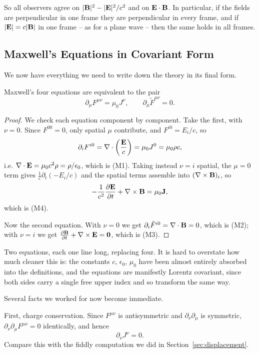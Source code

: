 \documentclass[a4paper]{scrartcl}
\begin{document}
So all observers agree on $|\mathbf{B}|^2 - |\mathbf{E}|^2/c^2$ and on $\mathbf{E}\cdot\mathbf{B}$. In particular, if the fields are perpendicular in one frame they are perpendicular in every frame, and if $|\mathbf{E}| = c|\mathbf{B}|$ in one frame -- as for a plane wave -- then the same holds in all frames.

\subsection{Maxwell's Equations in Covariant Form}

We now have everything we need to write down the theory in its final form.

\begin{theorem}
	Maxwell's four equations are equivalent to the pair
	$$
	\partial_\mu F^{\mu\nu} = \mu_0 J^\nu, \qquad \partial_\mu \tilde F^{\mu\nu} = 0.
	$$
\end{theorem}
\begin{proof}
	We check each equation component by component. Take the first, with $\nu = 0$. Since $F^{00} = 0$, only spatial $\mu$ contribute, and $F^{i0} = E_i/c$, so
	$$
	\partial_i F^{i0} = \nabla\cdot\left(\frac{\mathbf{E}}{c}\right) = \mu_0 J^0 = \mu_0 \rho c,
	$$
	i.e. $\nabla\cdot\mathbf{E} = \mu_0 c^2 \rho = \rho/\epsilon_0$, which is (M1). Taking instead $\nu = i$ spatial, the $\mu = 0$ term gives $\frac{1}{c}\partial_t(-E_i/c)$ and the spatial terms assemble into $(\nabla\times\mathbf{B})_i$, so
	$$
	-\frac{1}{c^2}\frac{\partial \mathbf{E}}{\partial t} + \nabla\times\mathbf{B} = \mu_0\mathbf{J},
	$$
	which is (M4).

	Now the second equation. With $\nu = 0$ we get $\partial_i \tilde F^{i0} = \nabla\cdot\mathbf{B} = 0$, which is (M2); with $\nu = i$ we get $\frac{\partial \mathbf{B}}{\partial t} + \nabla\times\mathbf{E} = \mathbf{0}$, which is (M3).
\end{proof}

Two equations, each one line long, replacing four. It is hard to overstate how much cleaner this is: the constants $c$, $\epsilon_0$, $\mu_0$ have been almost entirely absorbed into the definitions, and the equations are manifestly Lorentz covariant, since both sides carry a single free upper index and so transform the same way.

Several facts we worked for now become immediate.

First, charge conservation. Since $F^{\mu\nu}$ is antisymmetric and $\partial_\nu\partial_\mu$ is symmetric, $\partial_\nu\partial_\mu F^{\mu\nu} = 0$ identically, and hence
$$
\partial_\nu J^\nu = 0.
$$
Compare this with the fiddly computation we did in Section~\ref{sec:displacement}.
\end{document}
